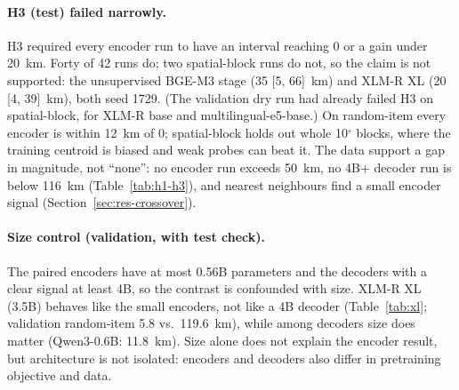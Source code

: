 \paragraph{H3 (test) failed narrowly.}
H3 required every encoder run to have an interval reaching 0 or a gain under 20~km. Forty of 42 runs do; two spatial-block runs do not, so the claim is not supported: the unsupervised BGE-M3 stage (35 [5, 66]~km) and XLM-R XL (20 [4, 39]~km), both seed 1729. (The validation dry run had already failed H3 on spatial-block, for XLM-R base and multilingual-e5-base.) On random-item every encoder is within 12~km of 0; spatial-block holds out whole 10$^\circ$ blocks, where the training centroid is biased and weak probes can beat it. The data support a gap in magnitude, not ``none'': no encoder run exceeds 50~km, no 4B+ decoder run is below 116~km (Table~\ref{tab:h1-h3}), and nearest neighbours find a small encoder signal (Section~\ref{sec:res-crossover}).

\paragraph{Size control (validation, with test check).}
The paired encoders have at most 0.56B parameters and the decoders with a clear signal at least 4B, so the contrast is confounded with size. XLM-R XL (3.5B) behaves like the small encoders, not like a 4B decoder (Table~\ref{tab:xl}; validation random-item 5.8 vs.\ 119.6~km), while among decoders size does matter (Qwen3-0.6B: 11.8~km). Size alone does not explain the encoder result, but architecture is not isolated: encoders and decoders also differ in pretraining objective and data.

